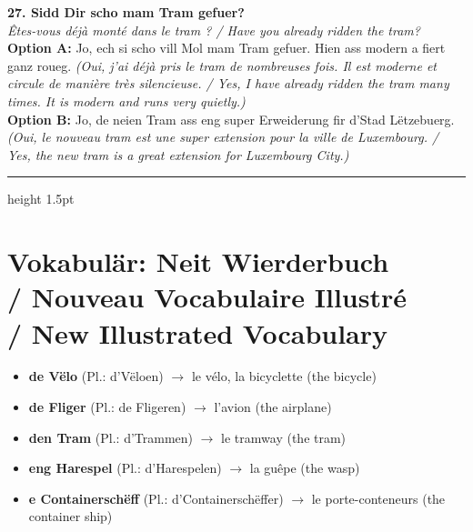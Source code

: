 \noindent\textbf{27. Sidd Dir scho mam Tram gefuer?}\\
\textit{Êtes-vous déjà monté dans le tram ? / Have you already ridden the tram?}\\
\textbf{Option A:} Jo, ech si scho vill Mol mam Tram gefuer. Hien ass modern a fiert ganz roueg. \textit{(Oui, j'ai déjà pris le tram de nombreuses fois. Il est moderne et circule de manière très silencieuse. / Yes, I have already ridden the tram many times. It is modern and runs very quietly.)}\\
\textbf{Option B:} Jo, de neien Tram ass eng super Erweiderung fir d'Stad Lëtzebuerg. \textit{(Oui, le nouveau tram est une super extension pour la ville de Luxembourg. / Yes, the new tram is a great extension for Luxembourg City.)}\\[1em]

\vspace{1.5cm}
\color{geminiBlue}\hrule height 1.5pt \vspace{0.5em}\color{black}
\section[Vokabulär: Neit Wierderbuch]{Vokabulär: Neit Wierderbuch \\/ Nouveau Vocabulaire Illustré \\/ New Illustrated Vocabulary}

\begin{itemize}
    \item \textbf{de Vëlo} (Pl.: d'Vëloen) $\rightarrow$ le vélo, la bicyclette (the bicycle)
    \item \textbf{de Fliger} (Pl.: de Fligeren) $\rightarrow$ l'avion (the airplane)
    \item \textbf{den Tram} (Pl.: d'Trammen) $\rightarrow$ le tramway (the tram)
    \item \textbf{eng Harespel} (Pl.: d'Harespelen) $\rightarrow$ la guêpe (the wasp)
    \item \textbf{e Containerschëff} (Pl.: d'Containerschëffer) $\rightarrow$ le porte-conteneurs (the container ship)
\end{itemize}

\vspace{1em}


